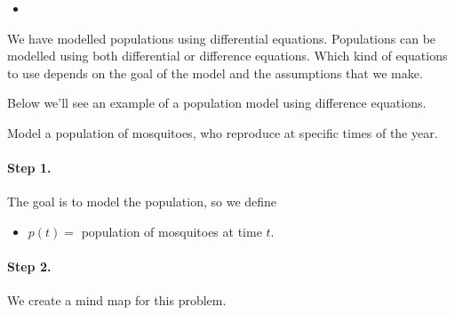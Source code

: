\begin{video}
\begin{itemize}
	\item {}
\end{itemize}	
\end{video}


\hfill



We have modelled populations using differential equations. Populations can be modelled using both differential or difference equations. Which kind of equations to use depends on the goal of the model and the assumptions that we make. 

Below we'll see an example of a population model using difference equations.


\begin{example}

Model a population of mosquitoes, who reproduce at specific times of the year.

\paragraph{Step 1.} The goal is to model the population, so we define
\begin{itemize}
	\item $p(t) = $ population of mosquitoes at time $t$.
\end{itemize}



\paragraph{Step 2.} We create a mind map for this problem.

\begin{center}
\end{center}




\end{example}
